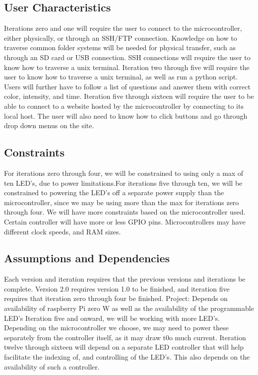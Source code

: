 \documentclass[onecolumn, draftclsnofoot,10pt, compsoc]{IEEEtran}
\begin{document}
		\subsection*{User Characteristics}
		Iterations zero and one will require the user to connect to the microcontroller, either physically, or through an SSH/FTP connection. Knowledge on how to traverse common folder systems will be needed for physical transfer, such as
		through an SD card or USB connection. SSH connections will require the user to know how to traverse a unix terminal.
		Iteration two through five will require the user to know how to traverse a unix terminal, as well as run a python script. Users will further have to follow a list of questions and answer them with correct color, intensity, and time.
		Iteration five through sixteen will require the user to be able to connect to a website hosted by the microcontroller by connecting to its local host. The user will also need to know how to click buttons and go through drop down menus on the site.

		\subsection*{Constraints}
		For iterations zero through four, we will be constrained to using only a max of ten LED’s, due to power limitations.For iterations five through ten, we will be constrained to powering the LED’s off a separate power supply than the microcontroller,
		since we may be using more than the max for iterations zero through four. We will have more constraints based on the microcontroller used. Certain controller will have more or less GPIO pins. Microcontrollers may have different clock speeds, and RAM sizes.

		\subsection*{Assumptions and Dependencies}
		Each version and iteration requires that the previous versions and iterations be complete. Version 2.0 requires version 1.0 to be finished, and iteration five requires that iteration zero through four be finished.
		Project: Depends on availability of raspberry Pi zero W as well as the availability of the programmable LED’s
		Iteration five and onward, we will be working with more LED’s. Depending on the microcontroller we choose, we may need to power these separately from the controller itself, as it may draw t0o much current.
		Iteration twelve through sixteen will depend on a separate LED controller that will help facilitate the indexing of, and controlling of the LED’s. This also depends on the availability of such a controller.
\end{document}
